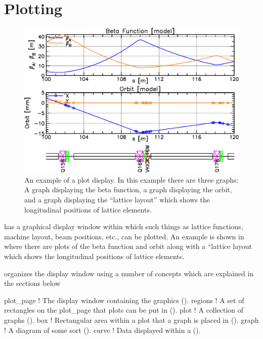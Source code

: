 \chapter{Plotting}
\label{c:plotting}

\begin{figure}[b]
  \centering
  \includegraphics[width=4.5in]{plot-typical.pdf}
  \caption[An example of a plot display.]
{An example of a plot display. In this example there are three graphs: A graph displaying the beta
function, a graph displaying the orbit, and a graph displaying the ``lattice layout'' which shows
the longitudinal positions of lattice elements.}
  \label{f:plot.typ}
\end{figure}

\tao has a graphical display window within which such things as lattice functions, machine layout,
beam positions, etc., can be plotted. An example is shown in  where there are plots
of the beta function and orbit along with a ``lattice layout which shows the longitudinal positions
of lattice elements. 

\tao organizes the display window using a number of concepts which are explained in the 
sections below
\begin{example}
  plot_page     ! The display window containing the graphics ().
  regions       ! A set of rectangles on the plot_page that plots can be put in ().
  plot          ! A collection of graphs ().
  box           ! Rectangular area within a plot that a graph is placed in ().
  graph         ! A diagram of some sort ().
  curve         ! Data displayed within a  ().
\end{example}

